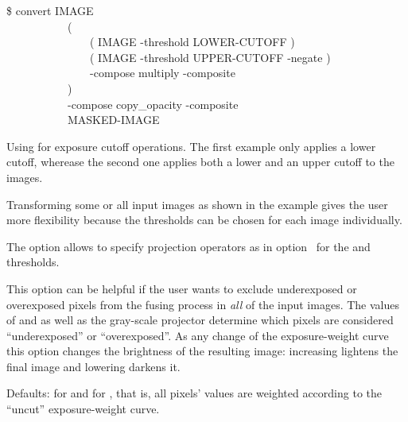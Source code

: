 \begin{codelist}
\begin{exemplar}[htbp]
    \smallskip

    \begin{terminal}
      \$ convert IMAGE \bslash \\
      ~~~~~~~~~~~\bslash( \bslash \\
      ~~~~~~~~~~~~~~~\bslash( IMAGE -threshold LOWER-CUTOFF \bslash) \bslash \\
      ~~~~~~~~~~~~~~~\bslash( IMAGE -threshold UPPER-CUTOFF -negate \bslash) \bslash \\
      ~~~~~~~~~~~~~~~-compose multiply -composite \bslash \\
      ~~~~~~~~~~~\bslash) \bslash \\
      ~~~~~~~~~~~-compose copy\_opacity -composite \bslash \\
      ~~~~~~~~~~~MASKED-IMAGE
    \end{terminal}

    \caption[ for exposure cutoff]{Using
       for exposure cutoff operations.  The
      first example only applies a lower cutoff, wherease the second
      one applies both a lower and an upper cutoff to the
      images.\label{ex:imagemagick-convert-cutoff}}
  \end{exemplar}

  Transforming some or all input images as shown in the example gives
  the user more flexibility because the thresholds can be chosen for
  each image individually.

  The option allows to specify projection operators as in
  option~ for the  and
   thresholds.

  This option can be helpful if the user wants to exclude underexposed
  or overexposed pixels from the fusing process in \emph{all} of the
  input images.  The values of  and
   as well as the gray-scale projector determine
  which pixels are considered ``underexposed'' or ``overexposed''.  As
  any change of the exposure-weight curve this option changes the
  brightness of the resulting image: increasing 
  lightens the final image and lowering  darkens
  it.

  Defaults:  for
   and 
  for , that is, all pixels' values are weighted
  according to the ``uncut'' exposure-weight curve.


\end{codelist}
